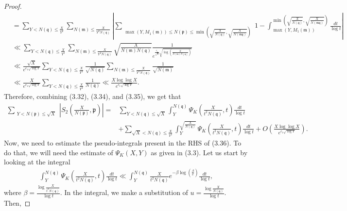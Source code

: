 \documentclass[12pt]{article}
\numberwithin{equation}{section}
\numberwithin{equation}{section}
\begin{document}
\begin{proof}
\begin{align}
    &= \sum_{Y<N(\mathfrak{q})\leq \frac{X}{Y^2}} \sum_{N(\mathfrak{m}) \leq \frac{X}{Y^2N(\mathfrak{q})}}\left|           \sum_{\substack{\max(Y,M_1(\mathfrak{m}))\leq N(\mathfrak{p})\leq  \min\left(\sqrt{\frac{X}{N(\mathfrak{q})}},\sqrt{\frac{X}{N(\mathfrak{mq})}}\right) }       }      1    -\int_{\max(Y,M_1(\mathfrak{m}))}^{\min\left(\sqrt{\frac{X}{N(\mathfrak{q})}},\sqrt{\frac{X}{N(\mathfrak{mq})}}\right)}\frac{dt}{\log t}          \right| \nonumber \\
    &\ll \sum_{Y<N(\mathfrak{q})\leq \frac{X}{Y^2}} \sum_{N(\mathfrak{m}) \leq \frac{X}{Y^2N(\mathfrak{q})}} \sqrt{\frac{X}{N(\mathfrak{m})N(\mathfrak{q})}}\frac{1}{e^{\frac{c_1}{\sqrt{2}}\sqrt{\log\left(\frac{X}{N(\mathfrak{m})N(\mathfrak{q})}\right)}}} \nonumber \\
    &\ll \frac{\sqrt{X}}{e^{c_1\sqrt{\log Y}}}\sum_{Y<N(\mathfrak{q})\leq \frac{X}{Y^2}} \frac{1}{\sqrt{N(\mathfrak{q})}} \sum_{N(\mathfrak{m}) \leq \frac{X}{Y^2N(\mathfrak{q})}} \frac{1}{\sqrt{N(\mathfrak{m})}} \nonumber \\
    &\ll \frac{X}{e^{c_1\sqrt{\log Y}}} \sum_{Y<N(\mathfrak{q})\leq \frac{X}{Y^2}}\frac{1}{N(\mathfrak{q})} \ll \frac{X\log\log X}{e^{c_1\sqrt{\log Y}}}.
\end{align}
Therefore, combining (3.32), (3.34), and (3.35), we get that
\begin{align}
     \sum_{\substack{Y<N(\mathfrak{p}) \leq \sqrt{X} }} \left|S_2\left(\frac{X}{N(\mathfrak{p})},\mathfrak{p}\right)\right| = &\sum_{Y<N(\mathfrak{q})\leq \sqrt{X}} \int_Y^{N(\mathfrak{q})} \Psi_K\left(\frac{X}{t^2N(\mathfrak{q})},t\right)\frac{dt}{\log t}\nonumber \\ &+ \sum_{\sqrt{X}<N(\mathfrak{q})\leq \frac{X}{Y^2}} \int_Y^{\sqrt{\frac{X}{N(\mathfrak{q})} } } \Psi_K\left(\frac{X}{t^2N(\mathfrak{q})},t\right)\frac{dt}{\log t} +O\left(\frac{X\log\log X}{e^{c_1\sqrt{\log Y}}}\right).
\end{align}
Now, we need to estimate the pseudo-integrals present in the RHS of (3.36). To do that, we will need the estimate of $\Psi_K(X,Y)$ as given in (3.3). Let us start by looking at the integral
\begin{eqnarray}
    \int_Y^{N(\mathfrak{q})} \Psi_K\left(\frac{X}{t^2N(\mathfrak{q})},t\right)\frac{dt}{\log t} \ll \int_Y^{N(\mathfrak{q})} \frac{X}{t^2N(\mathfrak{q})} e^{-\beta\log\left(\frac{\beta}{e}\right)}\frac{dt}{\log t},   
\end{eqnarray} 
where $\beta = \frac{\log \frac{X}{t^2N(\mathfrak{q})}}{\log t}$. In the integral, we make a substitution of $u = \frac{\log \frac{X}{N(\mathfrak{q})}}{\log t}$. Then,

\end{proof}
\end{document}
